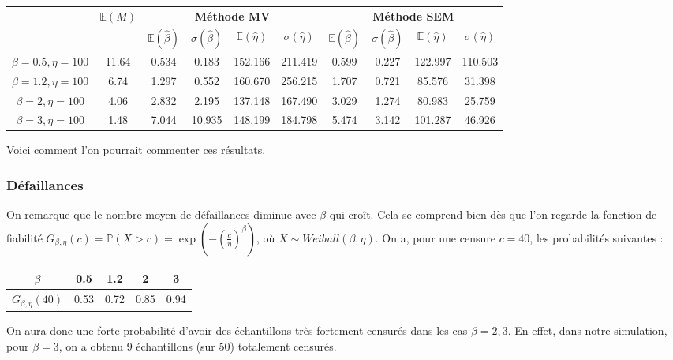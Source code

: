 \documentclass[a4paper]{report}
\begin{document}
 \begin{center}
\begin{tabular}{|c||c||c|c|c|c||c|c|c|c|}
	\hline
	\bf \multirow{2}{1.5cm}{Loi de Weibull} & \multirow{2}{1cm}{$\mathbb{E}(M)$} & \multicolumn{4}{c||}{\bf Méthode MV} & \multicolumn{4}{c|}{ \bf Méthode SEM} \\

	\cline{3-10}
	& & $\mathbb{E}(\hat{\beta})$  &  $\sigma(\hat{\beta})$ &  $\mathbb{E}(\hat{\eta})$ &  $\sigma(\hat{\eta})$ & $\mathbb{E}(\hat{\beta})$  &  $\sigma(\hat{\beta})$ &  $\mathbb{E}(\hat{\eta})$ &  $\sigma(\hat{\eta})$ \\
	\hline
	\bf $\beta=0.5, \eta=100$& 11.64 & 0.534 & 0.183 & 152.166 & 211.419 & 0.599 & 0.227 & 122.997& 110.503 \\
	\hline
	\bf $\beta=1.2, \eta=100$ & 6.74 & 1.297 & 0.552& 160.670 & 256.215& 1.707&0.721 &85.576 &31.398 \\
	\hline
	\bf $\beta=2, \eta=100$ &4.06 &2.832 &2.195 &137.148& 167.490& 3.029& 1.274& 80.983&25.759 \\
	\hline
	\bf $\beta=3, \eta=100$ &1.48 &7.044  &10.935 & 148.199 &184.798 &5.474 &3.142 &101.287 &46.926 \\
	\hline
\end{tabular}
\end{center}

Voici comment l'on pourrait commenter ces résultats.

\subsubsection*{Défaillances}
On remarque que le nombre moyen de défaillances diminue avec $\beta$ qui croît. Cela se comprend bien dès que l'on regarde la fonction de fiabilité $G_{\beta,\eta}(c) = \mathbb{P}(X>c) = \exp\left(-\left(\frac{c}{\eta}\right)^{\beta}\right)$, où $X \sim Weibull(\beta,\eta)$. On a, pour une censure $c=40$, les probabilités suivantes : 

\begin{center}
\begin{tabular}{|c|c|c|c|c|}
\hline
\bf $\beta$ & 0.5 & 1.2 & 2 & 3 \\
\hline
\bf $G_{\beta,\eta}(40)$ &0.53 & 0.72 &0.85 &0.94\\
\hline 
 \end{tabular}
 \end{center}
  
On aura donc une forte probabilité d'avoir des échantillons très fortement censurés dans les cas $\beta=2,3$. En effet, dans notre simulation, pour $\beta=3$, on a obtenu 9 échantillons (sur 50) totalement censurés. 
\end{document}

